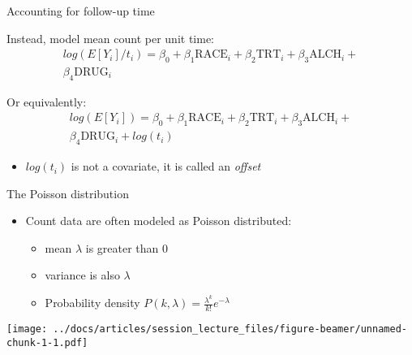 \documentclass[ignorenonframetext,]{beamer}
\providecommand{\tightlist}{%
  \setlength{\itemsep}{0pt}\setlength{\parskip}{0pt}}
\begin{document}
\begin{frame}{Accounting for follow-up time}
\protect\hypertarget{accounting-for-follow-up-time}{}

Instead, model mean count per unit time: \[
\begin{aligned}
log(E[Y_i]/t_i) = \beta_0 + \beta_1 \textrm{RACE}_i + \beta_2 \textrm{TRT}_i + 
\beta_3 \textrm{ALCH}_i + \nonumber \\ \beta_4 \textrm{DRUG}_i
\end{aligned}
\]

Or equivalently: \[
\begin{aligned}
log(E[Y_i]) = \beta_0 + \beta_1 \textrm{RACE}_i + \beta_2 \textrm{TRT}_i + 
\beta_3 \textrm{ALCH}_i + \nonumber \\ \beta_4 \textrm{DRUG}_i + log(t_i)
\end{aligned}
\]

\begin{itemize}
\tightlist
\item
  \(log(t_i)\) is not a covariate, it is called an \emph{offset}
\end{itemize}

\end{frame}

\begin{frame}{The Poisson distribution}
\protect\hypertarget{the-poisson-distribution}{}

\begin{itemize}
\tightlist
\item
  Count data are often modeled as Poisson distributed:

  \begin{itemize}
  \tightlist
  \item
    mean \(\lambda\) is greater than 0
  \item
    variance is also \(\lambda\)
  \item
    Probability density
    \(P(k, \lambda) = \frac{\lambda^k}{k!} e^{-\lambda}\)
  \end{itemize}
\end{itemize}

\texttt{[image: ../docs/articles/session\_lecture\_files/figure-beamer/unnamed-chunk-1-1.pdf]}

\end{frame}
\end{document}

